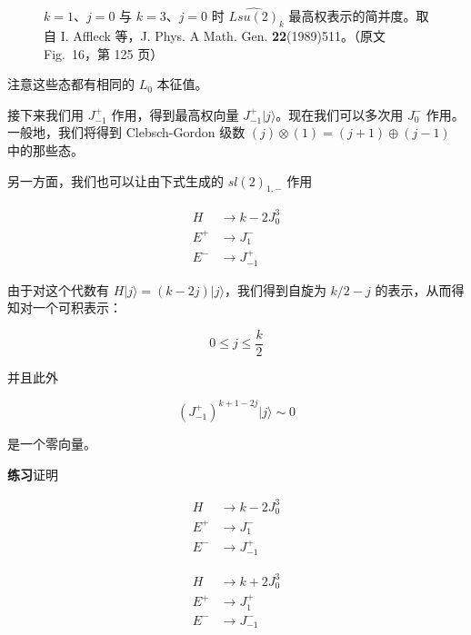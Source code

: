\begin{figure}[htbp]
  \centering
  \MissingFigureNote
  \caption{$k=1$、$j=0$ 与 $k=3$、$j=0$ 时 $\widehat{Lsu(2)}_k$ 最高权表示的简并度。取自 I. Affleck 等，J. Phys. A Math. Gen. \textbf{22}(1989)511。（原文 Fig.~16，第 125 页）}
  \label{fig:16}
\end{figure}

注意这些态都有相同的 $L_0$ 本征值。

接下来我们用 $J^+_{-1}$ 作用，得到最高权向量 $J^+_{-1}|j\rangle$。现在我们可以多次用 $J^-_0$ 作用。一般地，我们将得到 Clebsch-Gordon 级数 $(j)\otimes(1)=(j+1)\oplus(j-1)$ 中的那些态。

另一方面，我们也可以让由下式生成的 $sl(2)_{1,-}$ 作用

\begin{equation}
  \begin{aligned}
    H &\to k-2J^3_0\\
    E^+ &\to J^-_1\\
    E^- &\to J^+_{-1}
  \end{aligned}
  \tag{4.138}
  \label{eq:4.138}
\end{equation}

由于对这个代数有 $H|j\rangle=(k-2j)|j\rangle$，我们得到自旋为 $k/2-j$ 的表示，从而得知对一个可积表示：

\begin{equation}
  0\le j\le\frac{k}{2}
  \tag{4.139}
  \label{eq:4.139}
\end{equation}

并且此外

\begin{equation}
  (J^+_{-1})^{k+1-2j}|j\rangle\sim0
  \tag{4.140}
  \label{eq:4.140}
\end{equation}

是一个零向量。

\medskip\noindent\textbf{练习}\quad 证明

\begin{equation}
  \begin{aligned}
    H &\to k-2J^3_0\\
    E^+ &\to J^-_1\\
    E^- &\to J^+_{-1}
  \end{aligned}
  \tag{4.141}
  \label{eq:4.141}
\end{equation}

\begin{equation}
  \begin{aligned}
    H &\to k+2J^3_0\\
    E^+ &\to J^+_1\\
    E^- &\to J^-_{-1}
  \end{aligned}
  \tag{4.142}
  \label{eq:4.142}
\end{equation}

